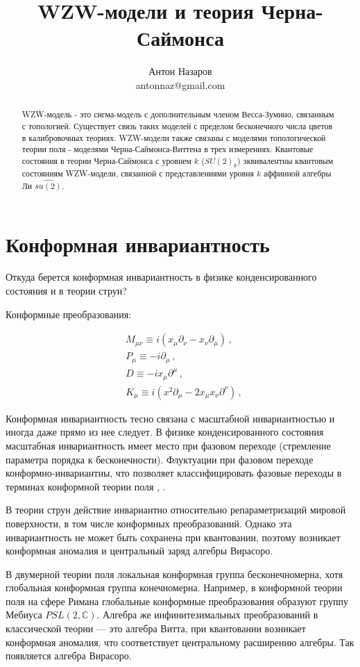 \documentclass[a4paper,12pt]{article}
\title{WZW-модели и теория Черна-Саймонса}
\author{Антон Назаров\\ antonnaz@gmail.com}
\theoremstyle{definition} \newtheorem{Def}{Definition}
\begin{document}
\maketitle
\begin{abstract}
WZW-модель - это сигма-модель с дополнительным членом Весса-Зумино, связанным с топологией. Существует связь таких моделей с пределом бесконечного числа цветов в калибровочных теориях. WZW-модели также связаны с моделями топологической теории поля - моделями Черна-Саймонса-Виттена в трех измерениях. Квантовые состояния в теории Черна-Саймонса с уровнем $k$ ($SU(2)_k$) эквивалентны квантовым состояниям WZW-модели, связанной с представлениями уровня $k$ аффинной алгебры Ли $\widehat{su(2)}$.
\end{abstract}

\section{Конформная инвариантность}
\label{sec:conformal-invariance}

Откуда берется конформная инвариантность в физике конденсированного состояния и в теории струн?

Конформные преобразования:

    \begin{align} & M_{\mu\nu} \equiv i(x_\mu\partial_\nu-x_\nu\partial_\mu) \,, \\ &P_\mu \equiv-i\partial_\mu \,, \\ &D \equiv-ix_\mu\partial^\mu \,, \\ &K_\mu \equiv i(x^2\partial_\mu-2x_\mu x_\nu\partial^\nu) \,, \end{align} 

Конформная инвариантность тесно связана с масштабной инвариантностью и иногда даже прямо из нее следует. В физике конденсированного состояния масштабная инвариантность имеет место при фазовом переходе (стремление параметра порядка к бесконечности). Флуктуации при фазовом переходе конформно-инвариантны, что позволяет классифицировать фазовые переходы в терминах конформной теории поля \cite{Polyakov:1970xd}, \cite{belavin1984ics}.

В теории струн действие инвариантно относительно репараметризаций мировой поверхности, в том числе конформных преобразований. 
Однако эта инвариантность не может быть сохранена при квантовании, поэтому возникает конформная аномалия и центральный заряд алгебры Вирасоро.

В двумерной теории поля локальная конформная группа бесконечномерна, хотя глобальная конформная группа конечномерна. Например, в конформной теории поля на сфере Римана глобальные конформные преобразования образуют группу Мебиуса $PSL(2,\mathbb{C})$. Алгебра же инфинитезимальных преобразований в классической теории --- это алгебра Витта, при квантовании возникает конформная аномалия, что соответствует центральному расширению алгебры. Так появляется алгебра Вирасоро.
\end{document}
